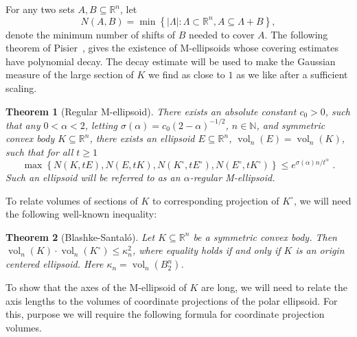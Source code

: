\documentclass[11pt]{article}
\newtheorem{theorem}{Theorem}
\newcommand{\R}{{\mathbb{R}}}
\newcommand{\N}{{\mathbb{N}}}
\newcommand{\set}[1]{\left\{ #1 \right\}}
\DeclareMathOperator{\vol}{vol}
\begin{document}
For any two sets $A,B \subseteq \R^n$, let 
\[
N(A,B) = \min \set{|\Lambda|: \Lambda \subset \R^n, A \subseteq \Lambda+B} ,
\]
denote the minimum number of shifts of $B$ needed to cover $A$. The following
theorem of Pisier~\cite{Pisier-book}, gives the existence of M-ellipsoids whose
covering estimates have polynomial decay. The decay estimate will be used to
make the Gaussian measure of the large section of $K$ we find as close to $1$ as
we like after a sufficient scaling. 

\begin{theorem}[Regular M-ellipsoid]
\label{thm:reg-m}
There exists an absolute constant $c_0 > 0$, such that any $0 < \alpha < 2$,
letting $\sigma(\alpha) = c_0(2-\alpha)^{-1/2}$, $n \in \N$, and symmetric
convex body $K \subseteq \R^n$, there exists an ellipsoid $E \subseteq \R^n$,
$\vol_n(E)=\vol_n(K)$, such that for all $t \geq 1$
\[
\max \set{N(K,tE),N(E,tK),N(K^\circ,tE^\circ),N(E^\circ,tK^\circ)} \leq
e^{\sigma(\alpha) n / t^\alpha} \text{ .}
\]
Such an ellipsoid will be referred to as an $\alpha$-regular M-ellipsoid.
\end{theorem}

To relate volumes of sections of $K$ to corresponding projection of $K^\circ$,
we will need the following well-known inequality:

\begin{theorem}[Blashke-Santal{\'o}]\label{thm:santalo} 
Let $K \subseteq \R^n$ be a symmetric convex body. Then $\vol_n(K)\cdot
\vol_n(K^\circ) \leq \kappa_n^2$, where equality holds if and only if $K$ is
an origin centered ellipsoid. Here $\kappa_n = \vol_n(B_2^n)$.
\end{theorem}


To show that the axes of the M-ellipsoid of $K$ are long, we will need to relate
the axis lengths to the volumes of coordinate projections of the polar
ellipsoid. For this, purpose we will require the following formula for
coordinate projection volumes. 
\end{document}
